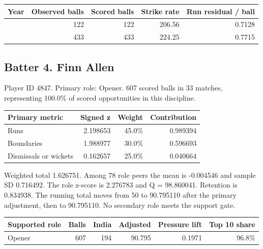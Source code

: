 \begin{center}
\begin{tabularx}{\linewidth}{>{\raggedright\arraybackslash}Xrrrr}
\toprule
Year & Observed balls & Scored balls & Strike rate & Run residual / ball \\
\midrule
2025 & 122 & 122 & 206.56 & 0.7128 \\
2026 & 433 & 433 & 224.25 & 0.7715 \\
\bottomrule
\end{tabularx}
\end{center}



\clearpage

\subsection{Batter 4. Finn Allen}

Player ID 4847. Primary role: Opener. 607 scored balls in 33 matches, representing 100.0\% of scored opportunities in this discipline.

\begin{center}
\begin{tabularx}{\linewidth}{>{\raggedright\arraybackslash}Xrrr}
\toprule
Primary metric & Signed z & Weight & Contribution \\
\midrule
Runs & 2.198653 & 45.0\% & 0.989394 \\
Boundaries & 1.988977 & 30.0\% & 0.596693 \\
Dismissals or wickets & 0.162657 & 25.0\% & 0.040664 \\
\bottomrule
\end{tabularx}
\end{center}

Weighted total 1.626751. Among 78 role peers the mean is -0.004546 and sample SD 0.716492. The role z-score is 2.276783 and Q = 98.860041. Retention is 0.834938. The running total moves from 50 to 90.795110 after the primary adjustment, then to 90.795110. No secondary role meets the support gate.

\begin{center}
\begin{tabularx}{\linewidth}{>{\raggedright\arraybackslash}Xrrrrr}
\toprule
Supported role & Balls & India & Adjusted & Pressure lift & Top 10 share \\
\midrule
Opener & 607 & 194 & 90.795 & 0.1971 & 96.8\% \\
\bottomrule
\end{tabularx}
\end{center}

